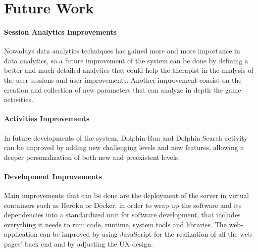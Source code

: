 	\chapter{Future Work}
	
	\subsubsection{\textbf{\Large Session Analytics Improvements}}
	Nowadays data analytics techniques has gained more and more importance in data analytics, so a future improvement of the system can be done by defining a better and much detailed analytics that could help the therapist in the analysis of the user sessions and user improvements. \newline
	Another improvement consist on the creation and collection of new parameters that can analyze in depth the game activities.
	
	
	\subsubsection{\textbf{\Large Activities Improvements}}
	In future developments of the system, Dolphin Run and Dolphin Search activity can be improved by adding new challenging levels and new features, allowing a deeper personalization of both new and preexistent levels.
	
	\subsubsection{\textbf{\Large Development Improvements}}
	Main improvements that can be done are the deployment of the server in virtual containers such as Heroku or Docker, in order to wrap up  the software and its dependencies into a standardized unit for software development, that includes everything it needs to run: code, runtime, system tools and libraries. \newline
	The web-application can be improved by using JavaScript for the realization of all the web pages' back end and by adjusting the UX design.
	


	
	
	
